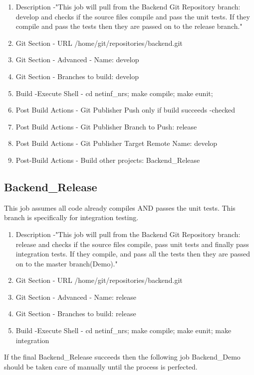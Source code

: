 \begin{enumerate}
\item Description -"This job will pull from the Backend Git Repository branch: develop and checks if the source files compile and pass the unit tests. If they compile and pass the tests then they are passed on to the release branch."
\item Git Section - URL /home/git/repositories/backend.git
\item Git Section - Advanced - Name: develop
\item Git Section - Branches to build: develop
\item Build -Execute Shell - cd netinf\_nrs; make compile; make eunit;
\item Post Build Actions - Git Publisher Push only if build succeeds -checked
\item Post Build Actions - Git Publisher Branch to Push: release
\item Post Build Actions - Git Publisher Target Remote Name: develop
\item Post-Build Actions - Build other projects:  Backend\_Release
\end{enumerate}

\subsection{Backend\_Release}

This job assumes all code already compiles AND passes the unit tests. This branch is specifically for integration testing.

\begin{enumerate}
\item Description -"This job will pull from the Backend Git Repository branch: release and checks if the source files compile, pass unit tests and finally pass integration tests. If they compile, and pass all the tests then they are passed on to the master branch(Demo)."
\item Git Section - URL /home/git/repositories/backend.git
\item Git Section - Advanced - Name: release
\item Git Section - Branches to build: release
\item Build -Execute Shell - cd netinf\_nrs; make compile; make eunit; make integration
\end{enumerate}

If the final Backend\_Release succeeds then the following job Backend\_Demo should be taken care of manually until the process is perfected.

